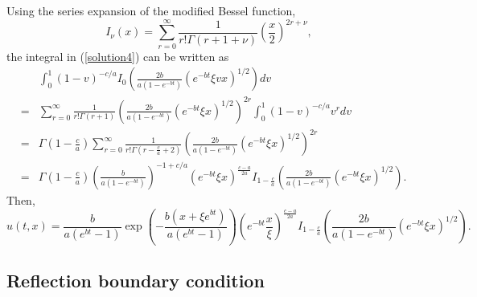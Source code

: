 \documentclass[12pt]{article}
\begin{document}
    Using the series expansion of the modified Bessel function,
    \begin{equation}
      I_{\nu}(x) = \sum_{r=0}^{\infty}\frac{1}{r!\Gamma(r+1+\nu)}\left(\frac{x}{2}\right)^{2r+\nu},
    \end{equation}
    the integral in (\ref{solution4}) can be written as
    \begin{eqnarray}
       && \int_0^1(1-v)^{-c/a}I_0\left(\frac{2b}{a(1-e^{-bt})}\left(e^{-bt}\xi v x\right)^{1/2}\right)dv \nonumber\\
      &=& \sum_{r=0}^{\infty}\frac{1}{r!\Gamma(r+1)}\left(\frac{2b}{a(1-e^{-bt})}\left(e^{-bt}\xi x\right)^{1/2}\right)^{2r}\int_0^1(1-v)^{-c/a}v^rdv \nonumber\\
      &=& \Gamma\left(1-\frac{c}{a}\right)\sum_{r=0}^{\infty}\frac{1}{\displaystyle r!\Gamma\left(r-\frac{c}{a}+2\right)}
              \left(\frac{2b}{a(1-e^{-bt})}\left(e^{-bt}\xi x\right)^{1/2}\right)^{2r} \nonumber\\
      &=& \Gamma\left(1-\frac{c}{a}\right)\left(\frac{b}{a(1-e^{-bt})}\right)^{-1+c/a}\left(e^{-bt}\xi x\right)^{\frac{c-a}{2a}}I_{1-\frac{c}{a}}
              \left(\frac{2b}{a(1-e^{-bt})}\left(e^{-bt}\xi x\right)^{1/2}\right).
    \end{eqnarray}
    Then,
    \begin{equation}
      u(t,x) = \frac{b}{a(e^{bt}-1)}\exp\left(-\frac{b(x+\xi e^{bt})}{a(e^{bt}-1)}\right)
                \left(e^{-bt}\frac{x}{\xi}\right)^{\frac{c-a}{2a}}I_{1-\frac{c}{a}}\left(\frac{2b}{a(1-e^{-bt})}\left(e^{-bt}\xi x\right)^{1/2}\right).
    \end{equation}

  \subsection{Reflection boundary condition}
\end{document}
